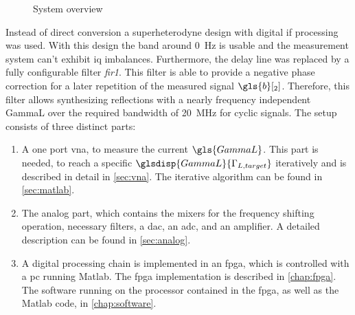 \documentclass[12pt,a4paper,parskip=full,abstract=true,BCOR=12mm]{scrreprt}
\def\device#1{\mbox{\textit{#1}}}
\begin{document}
\begin{figure}[htb]
{
    }
    \caption{System overview}
    \label{fig:overall_hf}
\end{figure}

Instead of direct conversion a superheterodyne design with digital \gls{if} processing
was used. With this design the band around \SI{0}{\hertz} is usable and the
measurement system can't exhibit \gls{iq} imbalances. Furthermore, the delay line was replaced by
a fully configurable filter \device{fir1}. This filter is able to provide a
negative phase correction for a later repetition of the measured signal $\gls{b}[_2]$.
Therefore, this filter allows synthesizing reflections with a nearly frequency
independent \gls{GammaL} over the required bandwidth of \SI{20}{\mega\hertz} for
cyclic signals. The setup consists of three distinct parts:

\begin{enumerate}
    \item A one port \gls{vna}, to measure the current $\gls{GammaL}$. This part is
needed, to reach a specific $\glsdisp{GammaL}{\Gamma_{L,target}}$ iteratively and is
described in detail in \cref{sec:vna}. The iterative algorithm can be found
in \cref{sec:matlab}.
    \item The analog part, which contains the mixers for the frequency shifting operation, necessary
        filters, a \gls{dac}, an \gls{adc}, and an amplifier. A detailed description can be found
        in \cref{sec:analog}.
    \item A digital processing chain is implemented in an \gls{fpga}, which is controlled with
a \gls{pc} running Matlab. The \gls{fpga} implementation is described in \cref{chap:fpga}.
The software running on the processor contained in the \gls{fpga}, as well as the Matlab
code, in \cref{chap:software}.
\end{enumerate}
\end{document}
